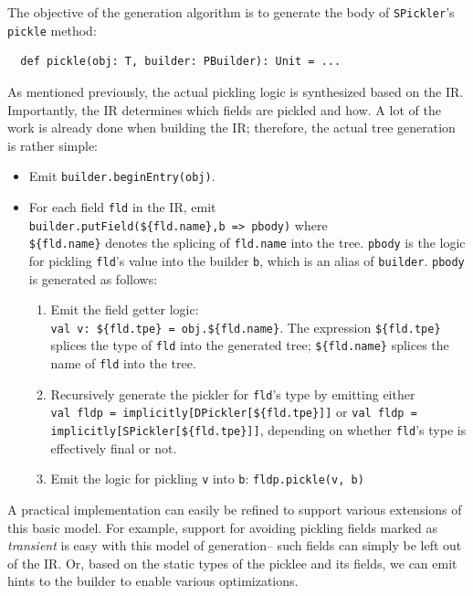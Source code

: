 \documentclass[10pt]{sigplanconf}
\theoremstyle{definition}
\theoremstyle{definition}
\newcommand{\term}[1]{\mbox{\texttt{#1}}}
\begin{document}
The objective of the generation algorithm is to generate the body of
\term{SPickler}'s \term{pickle} method:

\begin{lstlisting}
  def pickle(obj: T, builder: PBuilder): Unit = ...
\end{lstlisting}

As mentioned previously, the actual pickling logic is synthesized based on the
IR. Importantly, the IR determines which fields are pickled and how. A lot of
the work is already done when building the IR; therefore, the actual tree
generation is rather simple:

\begin{itemize}

\item Emit \verb|builder.beginEntry(obj)|.

\item For each field \term{fld} in the IR, emit \\\verb|builder.putField(${fld.name},b => pbody)|
where \\\verb|${fld.name}| denotes the splicing of \term{fld.name}
into the tree. \term{pbody} is the logic for pickling \term{fld}'s value into
the builder \term{b}, which is an alias of \term{builder}. \term{pbody} is generated
as follows:
  \begin{enumerate}

  \item Emit the field getter logic:
  \\\verb|val v: ${fld.tpe} = obj.${fld.name}|. The
  expression \verb|${fld.tpe}| splices the type of \term{fld} into the generated
  tree; \verb|${fld.name}| splices the name of \term{fld} into the tree.

  \item Recursively generate the pickler for \term{fld}'s type by emitting either
  \\\verb|val fldp = implicitly[DPickler[${fld.tpe}]]| or \verb|val fldp = implicitly[SPickler[${fld.tpe}]]|,
  depending on whether \term{fld}'s type is effectively final or not.

  \item Emit the logic for pickling \term{v} into \term{b}: \verb|fldp.pickle(v, b)|
  \end{enumerate}
\end{itemize}

A practical implementation can easily be refined to support various extensions
of this basic model. For example, support for avoiding pickling fields marked
as {\em transient} is easy with this model of generation-- such fields can
simply be left out of the IR. Or, based on the static types of the picklee and
its fields, we can emit hints to the builder to enable various optimizations.
\end{document}
